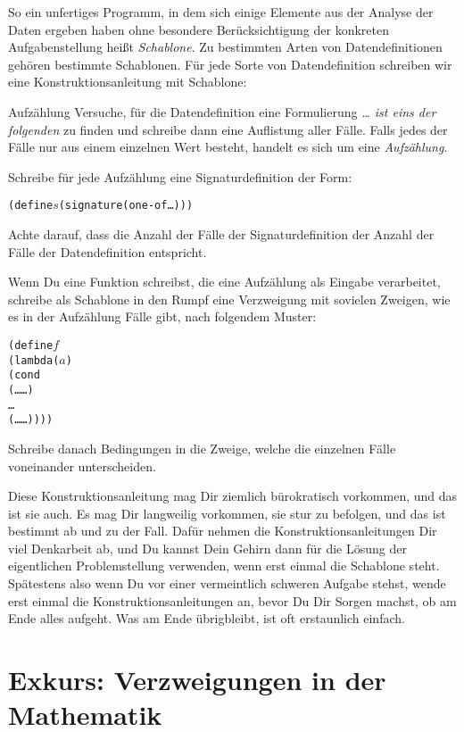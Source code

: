 So ein unfertiges Programm, in dem sich einige Elemente aus der
Analyse der Daten ergeben haben ohne besondere Berücksichtigung der
konkreten Aufgabenstellung heißt \textit{Schablone}.  Zu bestimmten
Arten von Datendefinitionen gehören bestimmte Schablonen.  Für jede
Sorte von Datendefinition schreiben wir eine Konstruktionsanleitung
mit Schablone:
%
\begin{konstruktionsanleitung}{Aufzählung}
  \label{ka:aufzaehlung}
  Versuche, für die Datendefinition eine Formulierung \emph{\ldots{}
    ist eins der folgenden} zu finden und schreibe dann eine
  Auflistung aller Fälle.  Falls jedes der Fälle nur aus einem
  einzelnen Wert besteht, handelt es sich um eine
  \textit{Aufzählung}.

  Schreibe für jede Aufzählung eine Signaturdefinition der Form:
\begin{alltt}
(define \(s\) (signature (one-of \ldots)))
\end{alltt}
  Achte darauf, dass die Anzahl der Fälle der Signaturdefinition der
  Anzahl der Fälle der Datendefinition entspricht.
  
  Wenn Du eine Funktion schreibst, die eine Aufzählung als Eingabe
  verarbeitet, schreibe als Schablone in den Rumpf eine Verzweigung
  mit sovielen Zweigen, wie es in der Aufzählung Fälle gibt, nach
  folgendem Muster:
\begin{alltt}
(define \(f\)
  (lambda (\(a\))
    (cond
      (\ldots{} \ldots)
      \ldots
      (\ldots{} \ldots))))
\end{alltt}
  Schreibe danach Bedingungen in die Zweige, welche die einzelnen
  Fälle voneinander unterscheiden.
\end{konstruktionsanleitung}
%
Diese Konstruktionsanleitung mag Dir ziemlich bürokratisch vorkommen,
und das ist sie auch.  Es mag Dir langweilig vorkommen, sie stur zu
befolgen, und das ist bestimmt ab und zu der Fall.  Dafür nehmen die
Konstruktionsanleitungen Dir viel Denkarbeit ab, und Du kannst Dein
Gehirn dann für die Lösung der eigentlichen Problemstellung verwenden,
wenn erst einmal die Schablone steht.  Spätestens also wenn Du vor
einer vermeintlich schweren Aufgabe stehst, wende erst einmal die
Konstruktionsanleitungen an, bevor Du Dir Sorgen machst, ob am Ende
alles aufgeht.  Was am Ende übrigbleibt, ist oft erstaunlich einfach.

\section{Exkurs: Verzweigungen in der Mathematik}

